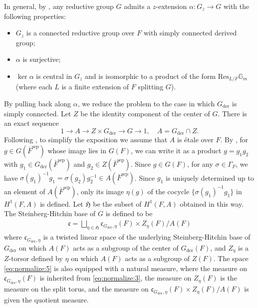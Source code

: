 \documentclass[iccmp]{ipbook}
\newcommand{\BG}{{\mathbb {G}}}
\newcommand{\FH}{{\mathfrak {H}}}
\newcommand{\Fc}{{\mathfrak {c}}}
\newcommand{\Res}{{\mathrm{Res}}}
\def\alp{{\alpha}}
\def\sig{{\sigma}}
\def\Gam{{\Gamma}}
\def\der{\mathrm{der}}
\def\sep{\mathrm{sep}}
\begin{document}
In general, by \cite{kott2}, any reductive group $G$ admits a $z$-extension $\alp:G_z\to G$ with the following properties:
\begin{itemize}
\item $G_z$ is a connected reductive group over $F$ with simply connected derived group;

\item $\alp$ is surjective;

\item $\ker \alp$ is central in $G_z$ and is isomorphic to a product of the form $\Res_{L/F}\BG_m$ (where each $L$ is a finite extension of $F$ splitting $G$).
\end{itemize}
By pulling back along $\alp$, we reduce the problem to the case in which $G_\der$ is simply connected. Let $Z$ be the identity component of the center of $G$. There is an exact sequence
\begin{equation}\label{eq:normalize:4}
1\to A\to Z\times G_\der\to G\to 1,\quad A=G_\der \cap Z.
\end{equation}
Following \cite{FLN10}, to simplify the exposition we assume that $A$ is étale over $F$. By \cite[Prop.~2.2]{MR207712}, for $g\in G(\bar{F}^\sep)$ whose image lies in $G(F)$, we can write it as a product $g=g_1g_2$ with $g_1\in G_\der(\bar{F}^\sep)$ and $g_2\in Z(\bar{F}^\sep)$. Since $g\in G(F)$, for any $\sig\in \Gam_F$, we have $\sig(g_1)^{-1}g_1 = \sig(g_2)g_2^{-1}\in A(\bar{F}^\sep)$. Since $g_1$ is uniquely determined up to an element of $A(\bar{F}^\sep)$, only its image $\eta(g)$ of the cocycle $\{\sig(g_1)^{-1}g_1\}$ in $H^1(F,A)$ is defined. Let $\FH$ be the subset of $H^1(F,A)$ obtained in this way. The Steinberg-Hitchin base of $G$ is defined to be
\begin{align}\label{eq:normalize:5}
\Fc = \bigsqcup_{\eta\in \FH}
\Fc_{G_\der,\eta}(F)\times Z_\eta(F)/A(F)
\end{align}
where $\Fc_{G_\der,\eta}$ is a twisted linear space of the underlying Steinberg-Hitchin base of $G_\der$ on which $A(F)$ acts as a subgroup of the center of $G_\der(F)$, and $Z_\eta$ is a $Z$-torsor defined by $\eta$ on which $A(F)$ acts as a subgroup of $Z(F)$. The space \eqref{eq:normalize:5} is also equipped with a natural measure, where the measure on $\Fc_{G_\der,\eta}(F)$ is inherited from \eqref{eq:normalize:3}, the measure on $Z_\eta(F)$ is the measure on the split torus, and the measure on $\Fc_{G_\der,\eta}(F)\times Z_\eta(F)/A(F)$ is given the quotient measure.
\end{document}
